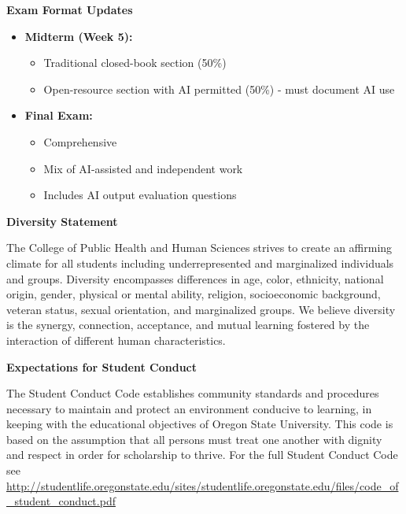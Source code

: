 \documentclass[11pt]{article}
\begin{document}
\vspace{8pt}

\noindent\textbf{Exam Format Updates}

\begin{itemize}[leftmargin=20pt]
\item \textbf{Midterm (Week 5):}
\begin{itemize}
\item Traditional closed-book section (50\%)
\item Open-resource section with AI permitted (50\%) - must document AI use
\end{itemize}
\item \textbf{Final Exam:}
\begin{itemize}
\item Comprehensive
\item Mix of AI-assisted and independent work
\item Includes AI output evaluation questions
\end{itemize}
\end{itemize}

\vspace{8pt}

\noindent\textbf{Diversity Statement}

The College of Public Health and Human Sciences strives to create an affirming climate for all students including underrepresented and marginalized individuals and groups. Diversity encompasses differences in age, color, ethnicity, national origin, gender, physical or mental ability, religion, socioeconomic background, veteran status, sexual orientation, and marginalized groups. We believe diversity is the synergy, connection, acceptance, and mutual learning fostered by the interaction of different human characteristics.

\vspace{8pt}

\noindent\textbf{Expectations for Student Conduct}

The Student Conduct Code establishes community standards and procedures necessary to maintain and protect an environment conducive to learning, in keeping with the educational objectives of Oregon State University. This code is based on the assumption that all persons must treat one another with dignity and respect in order for scholarship to thrive. For the full Student Conduct Code see \url{http://studentlife.oregonstate.edu/sites/studentlife.oregonstate.edu/files/code_of_student_conduct.pdf}
\end{document}
